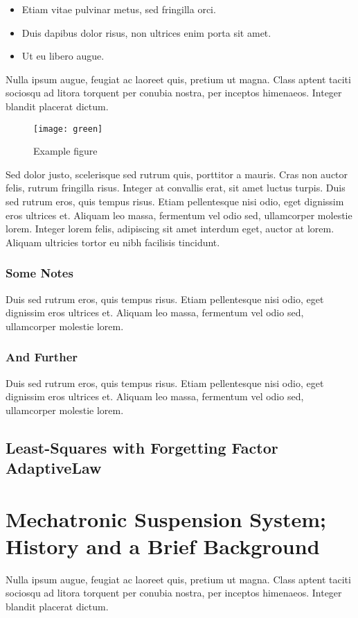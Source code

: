 \begin{itemize}
\item Etiam vitae pulvinar metus, sed fringilla orci. 
\item Duis dapibus dolor risus, non ultrices enim porta sit amet. 
\item Ut eu libero augue. 
\end{itemize}

Nulla ipsum augue, feugiat ac laoreet quis, pretium ut magna. Class aptent taciti sociosqu ad litora torquent per conubia nostra, per inceptos himenaeos. Integer blandit placerat dictum.

\begin{figure}[hbt!]\centering
\texttt{[image: green]}
\caption{Example figure}
\end{figure}

Sed dolor justo, scelerisque sed rutrum quis, porttitor a mauris. Cras non auctor felis, rutrum fringilla risus. Integer at convallis erat, sit amet luctus turpis. Duis sed rutrum eros, quis tempus risus. Etiam pellentesque nisi odio, eget dignissim eros ultrices et. Aliquam leo massa, fermentum vel odio sed, ullamcorper molestie lorem. Integer lorem felis, adipiscing sit amet interdum eget, auctor at lorem. Aliquam ultricies tortor eu nibh facilisis tincidunt.


\subsubsection{Some Notes}

Duis sed rutrum eros, quis tempus risus. Etiam pellentesque nisi odio, eget dignissim eros ultrices et. Aliquam leo massa, fermentum vel odio sed, ullamcorper molestie lorem.

\subsubsection{And Further}
Duis sed rutrum eros, quis tempus risus. Etiam pellentesque nisi odio, eget dignissim eros ultrices et. Aliquam leo massa, fermentum vel odio sed, ullamcorper molestie lorem.


\subsection{Least-Squares with Forgetting Factor AdaptiveLaw}

\section{Mechatronic Suspension System; History and a Brief Background}
Nulla ipsum augue, feugiat ac laoreet quis, pretium ut magna. Class aptent taciti sociosqu ad litora torquent per conubia nostra, per inceptos himenaeos. Integer blandit placerat dictum.



